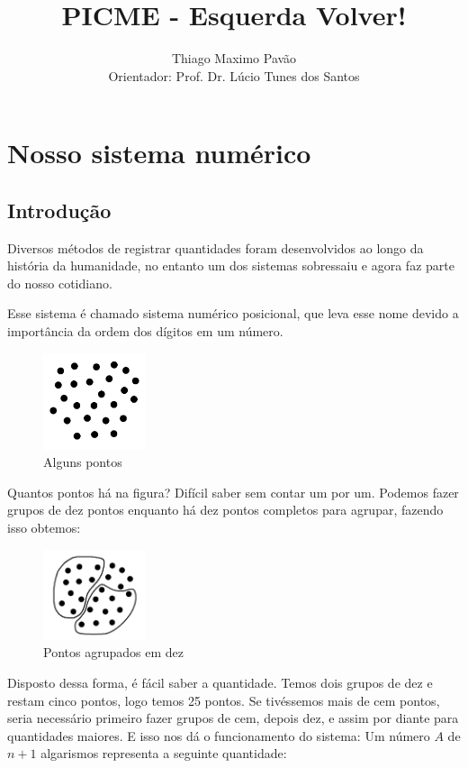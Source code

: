 \documentclass{report}
\title{PICME - Esquerda Volver!}
\author{Thiago Maximo Pavão\\ \small Orientador: Prof. Dr. Lúcio Tunes dos Santos}
\theoremstyle{definition}
\begin{document}
\date{}

\tableofcontents

\chapter{Nosso sistema numérico}
\label{chapter:secaoBases}

\section{Introdução}

Diversos métodos de registrar quantidades foram desenvolvidos ao longo da história da humanidade, no entanto um dos sistemas sobressaiu e agora faz parte do nosso cotidiano.

Esse sistema é chamado sistema numérico posicional, que leva esse nome devido a importância da ordem dos dígitos em um número. 

\begin{figure}[H]
    \centering
    \includegraphics[width=0.27\textwidth]{imgs/pontos.png}
    \caption{Alguns pontos}
\end{figure}

Quantos pontos há na figura? Difícil saber sem contar um por um. Podemos fazer grupos de dez pontos enquanto há dez pontos completos para agrupar, fazendo isso obtemos:

\begin{figure}[H]
    \centering
    \includegraphics[width=0.27\textwidth]{imgs/pontosAgrupados.png}
    \caption{Pontos agrupados em dez}
\end{figure}

Disposto dessa forma, é fácil saber a quantidade. Temos dois grupos de dez e restam cinco pontos, logo temos 25 pontos. Se tivéssemos mais de cem pontos, seria necessário primeiro fazer grupos de cem, depois dez, e assim por diante para quantidades maiores.
E isso nos dá o funcionamento do sistema: Um número $A$ de $n+1$ algarismos representa a seguinte quantidade:
\end{document}
